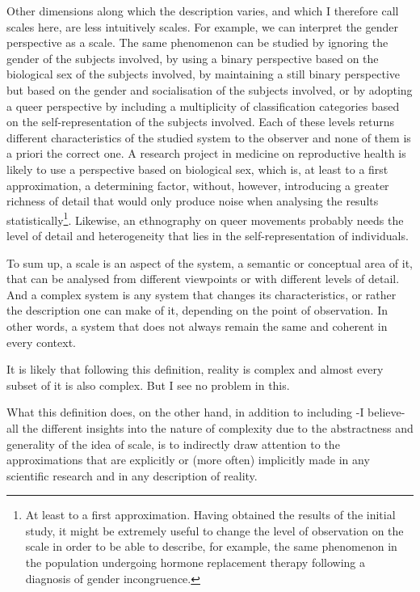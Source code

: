 \documentclass[a4paper, headings=standardclasses]{scrartcl}
\begin{document}
Other dimensions along which the description varies, and which I therefore call scales here, are less intuitively scales.
For example, we can interpret the gender perspective as a scale.
The same phenomenon can be studied by ignoring the gender of the subjects involved, by using a binary perspective based on the biological sex of the subjects involved, by maintaining a still binary perspective but based on the gender and socialisation of the subjects involved, or by adopting a queer perspective by including a multiplicity of classification categories based on the self-representation of the subjects involved.
Each of these levels returns different characteristics of the studied system to the observer and none of them is a priori the correct one.
A research project in medicine on reproductive health is likely to use a perspective based on biological sex, which is, at least to a first approximation, a determining factor, without, however, introducing a greater richness of detail that would only produce noise when analysing the results statistically\footnote{At least to a first approximation. Having obtained the results of the initial study, it might be extremely useful to change the level of observation on the scale in order to be able to describe, for example, the same phenomenon in the population undergoing hormone replacement therapy following a diagnosis of gender incongruence.}.
Likewise, an ethnography on queer movements probably needs the level of detail and heterogeneity that lies in the self-representation of individuals.

To sum up, a scale is an aspect of the system, a semantic or conceptual area of it, that can be analysed from different viewpoints or with different levels of detail.
And a complex system is any system that changes its characteristics, or rather the description one can make of it, depending on the point of observation. In other words, a system that does not always remain the same and coherent in every context.

It is likely that following this definition, reality is complex and almost every subset of it is also complex. But I see no problem in this.

What this definition does, on the other hand, in addition to including -I believe- all the different insights into the nature of complexity due to the abstractness and generality of the idea of scale, is to indirectly draw attention to the approximations that are explicitly or (more often) implicitly made in any scientific research and in any description of reality.
\end{document}
